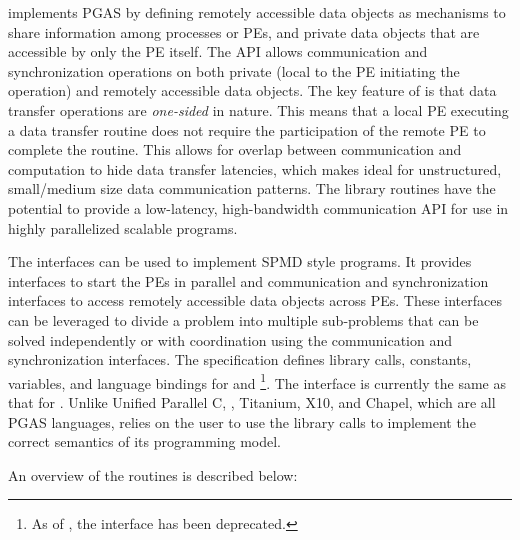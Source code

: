 \openshmem implements \ac{PGAS} by defining remotely accessible data objects as
mechanisms to share information among \openshmem processes or \acp{PE}, and
private data objects that are accessible by only the \ac{PE} itself. The \ac{API}
allows communication and synchronization operations on both private (local to
the PE initiating the operation) and remotely accessible data objects. The key
feature of \openshmem is that data transfer operations are
\emph{one-sided} in nature. This means that a local \ac{PE} executing
a data transfer routine does not require the participation of the remote \ac{PE}
to complete the routine. This allows for overlap between communication and
computation to hide data transfer latencies, which makes  \openshmem ideal for
unstructured, small/medium size data communication patterns. The \openshmem
library routines have the potential to provide a low-latency, high-bandwidth
communication \ac{API} for use in highly parallelized scalable programs.  

The \openshmem interfaces can be used to implement \ac{SPMD} style programs.
It provides interfaces to start the \openshmem \acp{PE} in parallel and
communication and synchronization interfaces to access remotely accessible data
objects across \acp{PE}. These interfaces can be leveraged to divide a problem
into multiple sub-problems that can be solved independently or with coordination
using the communication and synchronization interfaces.  The \openshmem
specification defines library calls, constants, variables, and language bindings
for \Cstd and \Fortran%
\footnote{As of \openshmem[1.4], the \Fortran interface has been deprecated.}.
The \Cpp interface is currently the same as that
for \Cstd. Unlike Unified Parallel C, \Fortran[2008], Titanium, X10, and Chapel, which are all
PGAS languages, \openshmem relies on the user to use the library calls  to
implement the correct semantics of its programming model.

An overview of the \openshmem routines is described below:

